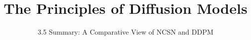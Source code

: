 ﻿%

\graphicspath{{../images/}}
\title{The Principles of Diffusion Models}
\subtitle{3.5 Summary: A Comparative View of NCSN and DDPM}


\begin{frame}
    \titlepage
\end{frame}


